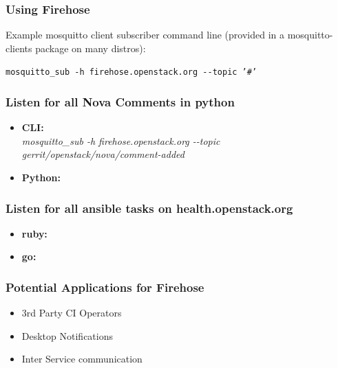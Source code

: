 \documentclass[aspectratio=169,11pt,hyperref={colorlinks=true}]{beamer}
\begin{document}
\begin{frame}
    \frametitle{Using Firehose}
    Example mosquitto client subscriber command line (provided in a
mosquitto-clients package on many distros):

    \begin{center}
        \texttt{mosquitto\_sub \--h firehose.openstack.org \--\--topic '\#'}
    \end{center}
\end{frame}

\begin{frame}
    \frametitle{Listen for all Nova Comments in python}
    \begin{itemize}
        \item \textbf{CLI:}\\
            \textit{mosquitto\_sub \--h firehose.openstack.org \--\--topic gerrit/openstack/nova/comment-added}
        \item \textbf{Python:}\\
            
    \end{itemize}
\end{frame}

\begin{frame}
    \frametitle{Listen for all ansible tasks on health.openstack.org}
    \begin{itemize}
        \item \textbf{ruby:} \\
            
    \end{itemize}
\end{frame}

\begin{frame}
    \begin{itemize}
        \item \textbf{go:} \\
            
    \end{itemize}
\end{frame}

\begin{frame}
    \frametitle{Potential Applications for Firehose}
    \begin{itemize}
        \item 3rd Party CI Operators
        \item Desktop Notifications
        \item Inter Service communication
    \end{itemize}
\end{frame}
\end{document}
